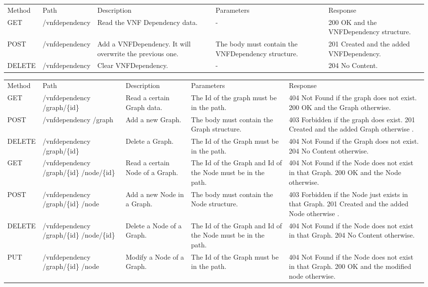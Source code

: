 \documentclass[11pt, english]{article}
\begin{document}
\begin{tabular}{ |p{2cm}|m{3cm}|p{3cm}|p{3cm}|p{4cm}| }
    \hline
    \rowcolor{black} \multicolumn{5}{|c|}{\textcolor{white}{VNFDependency}} \\
    \hline
    \rowcolor{Gray}
    Method & Path & Description & Parameters & Response \\
    \hline
    GET   & /vnfdependency & Read the VNF Dependency data. & - & 200 OK and the VNFDependency structure. \\
    \hline
    POST & /vnfdependency & Add a VNFDependency. It will overwrite the previous one. & The body must contain the VNFDependency structure. & 201 Created and the added VNFDependency. \\
    \hline
    DELETE & /vnfdependency & Clear VNFDependency. & - & 204 No Content. \\
    \hline
\end{tabular}

\begin{tabular}{ |p{2cm}|m{3cm}|p{3cm}|p{3cm}|p{4cm}| }
    \hline
    \rowcolor{black} \multicolumn{5}{|c|}{\textcolor{white}{VNFDependency:Graph-Node}} \\
    \hline
    \rowcolor{Gray}
    Method & Path & Description & Parameters & Response \\
    \hline
    GET   & /vnfdependency /graph/\{id\} & Read a certain Graph data. & The Id of the graph must be in the path. & 404 Not Found if the graph does not exist. 200 OK and the Graph otherwise. \\
    \hline
    POST & /vnfdependency /graph & Add a new Graph. & The body must contain the Graph structure. & 403 Forbidden if the graph does exist. 201 Created and the added Graph otherwise . \\
    \hline
    DELETE & /vnfdependency /graph/\{id\} & Delete a Graph. & The Id of the Graph must be in the path. & 404 Not Found if the Graph does not exist. 204 No Content otherwise. \\
    \hline
    GET   & /vnfdependency /graph/\{id\} /node/\{id\} & Read a certain Node of a Graph. & The Id of the Graph and Id of the Node must be in the path. & 404 Not Found if the Node does not exist in that Graph. 200 OK and the Node otherwise. \\
    \hline
    POST & /vnfdependency /graph/\{id\} /node & Add a new Node in a Graph. & The body must contain the Node structure. & 403 Forbidden if the Node just exists in that Graph. 201 Created and the added Node otherwise . \\
    \hline
    DELETE & /vnfdependency /graph/\{id\} /node/\{id\} & Delete a Node of a Graph. & The Id of the Graph and Id of the Node must be in the path. & 404 Not Found if the Node does not exist in that Graph. 204 No Content otherwise. \\
    \hline
    PUT & /vnfdependency /graph/\{id\} /node & Modify a Node of a Graph. & The Id of the Graph must be in the path. & 404 Not Found if the Node does not exist in that Graph. 200 OK and the modified node otherwise. \\
    \hline
\end{tabular}
\end{document}
